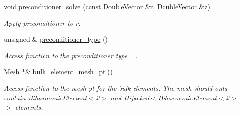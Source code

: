 \begin{DoxyCompactItemize}
void \hyperlink{classoomph_1_1BiharmonicPreconditioner_a205babb3fe007ed93113a0c52ee4cf7d}{preconditioner\+\_\+solve} (const \hyperlink{classoomph_1_1DoubleVector}{Double\+Vector} \&r, \hyperlink{classoomph_1_1DoubleVector}{Double\+Vector} \&z)
\begin{DoxyCompactList}\small\item\em Apply preconditioner to r. \end{DoxyCompactList}\item 
unsigned \& \hyperlink{classoomph_1_1BiharmonicPreconditioner_a6cbd786702f1faf6f9c3dca1b823e444}{preconditioner\+\_\+type} ()
\begin{DoxyCompactList}\small\item\em Access function to the preconditioner type ~\newline
. \end{DoxyCompactList}\item 
\hyperlink{classoomph_1_1Mesh}{Mesh} $\ast$\& \hyperlink{classoomph_1_1BiharmonicPreconditioner_abf6fed648ba0686273c79d0b85f61993}{bulk\+\_\+element\+\_\+mesh\+\_\+pt} ()
\begin{DoxyCompactList}\small\item\em Access function to the mesh pt for the bulk elements. The mesh should only contain Biharmonic\+Element$<$2$>$ and \hyperlink{classoomph_1_1Hijacked}{Hijacked}$<$Biharmonic\+Element$<$2$>$ $>$ elements. \end{DoxyCompactList}\end{DoxyCompactItemize}
